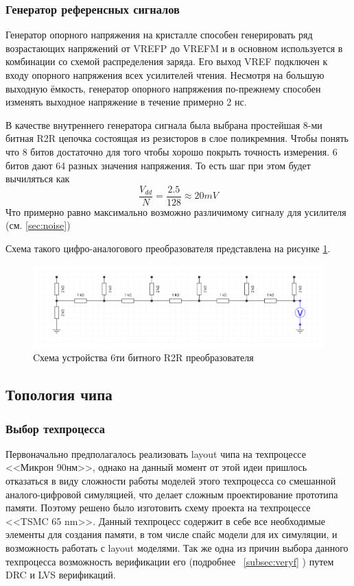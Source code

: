\documentclass[a4paper,12pt]{article} %
\begin{document}
\subsubsection{Генератор референсных сигналов}

Генератор опорного напряжения на кристалле способен генерировать ряд возрастающих напряжений от VREFP до VREFM и в основном используется в комбинации со схемой распределения заряда.  Его выход VREF подключен к входу опорного напряжения всех усилителей чтения.  Несмотря на большую выходную ёмкость, генератор опорного напряжения по-прежнему способен изменять выходное напряжение в течение примерно 2 нс.

В качестве внутреннего генератора сигнала была выбрана простейшая 8-ми битная R2R цепочка состоящая  из резисторов в слое поликремния. Чтобы понять что 8 битов достаточно для того чтобы хорошо покрыть точность измерения. 6 битов дают 64 разных значения напряжения. То есть шаг при этом будет вычиляться как $$ \frac{V_{dd}}{N}=\frac{2.5}{128}\approx 20 mV $$
Что примерно равно максимально возможно различимому сигналу для усилителя (см. \ref{sec:noise})

Схема такого цифро-аналогового преобразователя представлена на рисунке \ref{pic:r2r}.

\begin{figure}[H]
\centering
  \includegraphics[width=\linewidth]{r2r.png}
  \caption{Cхема устройства 6ти битного  R2R преобразователя}
  \label{pic:r2r}
\end{figure}

\subsection{Топология чипа}
\label{sec:layout}
\subsubsection{Выбор техпроцесса}
\label{subsec:DK}
Первоначально предполагалось реализовать layout чипа на техпроцессе <<Микрон 90нм>>, однако на данный момент от этой идеи пришлось отказаться в виду сложности работы моделей этого техпроцесса со смешанной аналого-цифровой симуляцией, что делает сложным проектирование прототипа памяти. Поэтому решено было изготовить схему проекта на техпроцессе <<TSMC 65 nm>>. Данный техпроцесс содержит в себе все необходимые элементы для создания памяти, в том числе спайс модели для их симуляции, и возможность работать с layout моделями. Так же одна из причин выбора данного техпроцесса возможность верификации его (подробнее ~\ref{subsec:veryf} ) путем DRC и LVS верификаций.
\end{document}
